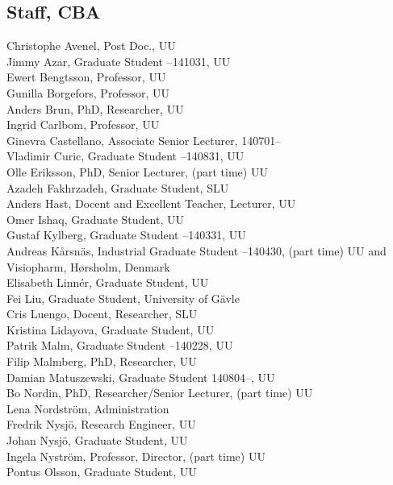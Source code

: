 \clearpage
\subsection{Staff, CBA}

\noindent
Christophe Avenel, Post Doc., UU\\
Jimmy Azar, Graduate Student --141031, UU\\
Ewert Bengtsson, Professor, UU\\
Gunilla Borgefors, Professor, UU\\
Anders Brun, PhD, Researcher, UU\\
Ingrid Carlbom, Professor, UU\\
Ginevra Castellano, Associate Senior Lecturer, 140701--\\
Vladimir Curic, Graduate Student --140831, UU\\
Olle Eriksson, PhD, Senior Lecturer, (part time) UU\\
Azadeh Fakhrzadeh, Graduate Student, SLU\\
Anders Hast, Docent and Excellent Teacher, Lecturer, UU\\
Omer Ishaq, Graduate Student, UU\\
Gustaf Kylberg, Graduate Student --140331, UU\\
Andreas K{\aa}rsn\"{a}s, Industrial Graduate Student --140430, (part time) UU and Visiopharm, H{\o}rsholm, Denmark\\
Elisabeth Linn\'er, Graduate Student, UU\\
Fei Liu, Graduate Student, University of G\"avle\\
Cris Luengo, Docent, Researcher, SLU\\
Kristina Lidayova, Graduate Student, UU\\
Patrik Malm, Graduate Student --140228, UU\\
Filip Malmberg, PhD, Researcher, UU\\
Damian Matuszewski, Graduate Student 140804--, UU\\
Bo Nordin, PhD, Researcher/Senior Lecturer, (part time) UU \\
Lena Nordstr\"{o}m, Administration\\
Fredrik Nysj\"{o}, Research Engineer, UU\\
Johan Nysj\"{o}, Graduate Student, UU\\
Ingela Nystr\"{o}m, Professor, Director, (part time) UU \\
Pontus Olsson, Graduate Student, UU\\
